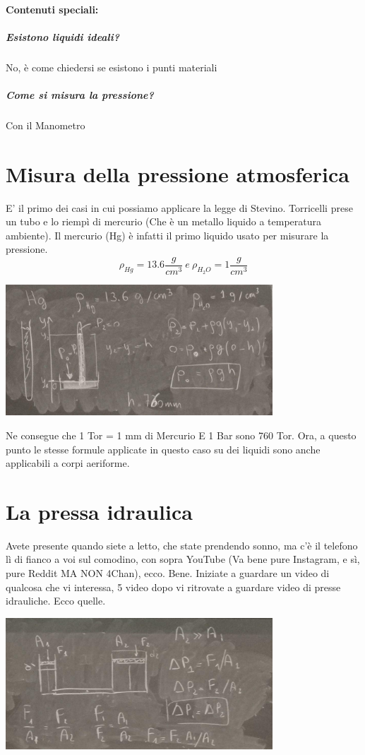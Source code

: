 \documentclass[12pt, a4paper, openany, oneside]{book}
\begin{document}
\paragraph{Contenuti speciali:}
\subparagraph{Esistono liquidi ideali? }No, è come chiedersi se esistono i punti
materiali
\subparagraph{Come si misura la pressione? }Con il Manometro
\section{Misura della pressione atmosferica}
E' il primo dei casi in cui possiamo applicare la legge di Stevino. Torricelli 
prese un tubo e lo riempì di mercurio (Che è un metallo liquido a temperatura 
ambiente). 
Il mercurio (Hg) è infatti il primo liquido usato per misurare la pressione. 
\[
	\rho_{Hg} = 13.6 \frac{g}{cm^{3}} ~ e ~ \rho_{H_{2}O} = 1 \frac{g}{cm^{3}}
\]
\begin{center}
\includegraphics[width=0.75\textwidth]{7}
\end{center}
Ne consegue che 1 Tor = 1 mm di Mercurio E 1 Bar sono 760 Tor.
Ora, a questo punto le stesse formule applicate in questo caso su dei liquidi
sono anche applicabili a corpi aeriforme. 
\section{La pressa idraulica}
Avete presente quando siete a letto, che state prendendo sonno, ma c'è il telefono
lì di fianco a voi sul comodino, con sopra YouTube (Va bene pure Instagram, e sì,
pure Reddit MA NON 4Chan), 
ecco. Bene. Iniziate
a guardare un video di qualcosa che vi interessa, 5 video dopo vi ritrovate a 
guardare video di presse idrauliche. Ecco quelle.
\begin{center}
\includegraphics[width=0.75\textwidth]{8}
\end{center}
\end{document}
